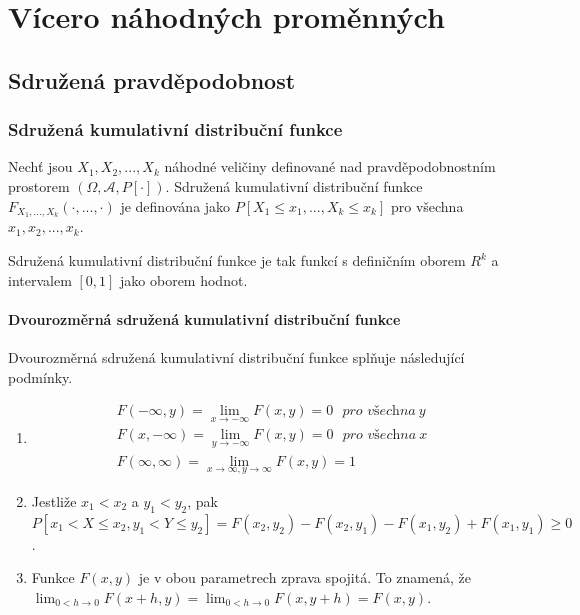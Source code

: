 \chapter{Vícero náhodných proměnných}

\section{Sdružená pravděpodobnost}

\subsection{Sdružená kumulativní distribuční funkce}

\begin{definition}
Nechť jsou $X_1, X_2, ..., X_k$ náhodné veličiny definované nad pravděpodobnostním prostorem $(\Omega, \mathscr{A}, P[\cdot])$. Sdružená kumulativní distribuční funkce $F_{X_1, ..., X_k}(\cdot, ..., \cdot)$ je definována jako $P[X_1 \le x_1, ..., X_k \le x_k]$ pro všechna $x_1, x_2, ..., x_k$.
\end{definition}

Sdružená kumulativní distribuční funkce je tak funkcí s definičním oborem $R^k$ a intervalem $[0, 1]$ jako oborem hodnot.

\subsubsection{Dvourozměrná sdružená kumulativní distribuční funkce}

\begin{theorem}
Dvourozměrná sdružená kumulativní distribuční funkce splňuje následující podmínky.
~
\begin{enumerate}
\item
\begin{gather*}
F(-\infty, y) = \lim_{x \rightarrow -\infty}F(x, y) = 0 ~~~\textit{pro všechna}~y\\
F(x, -\infty) = \lim_{y \rightarrow -\infty}F(x, y) = 0 ~~~\textit{pro všechna}~x\\
F(\infty, \infty) = \lim_{x \rightarrow \infty, y \rightarrow \infty}F(x, y) = 1
\end{gather*}
\item Jestliže $x_1 < x_2$ a $y_1 < y_2$, pak $P[x_1 < X \le x_2, y_1 < Y \le y_2] = F(x_2, y_2) - F(x_2, y_1) - F(x_1, y_2) + F(x_1, y_1) \ge 0$.
\item Funkce $F(x,y)$ je v obou parametrech zprava spojitá. To znamená, že $\lim_{0 < h \rightarrow 0}F(x + h, y) = \lim_{0 < h \rightarrow 0}F(x, y + h) = F(x, y)$.
\end{enumerate}
\end{theorem}

